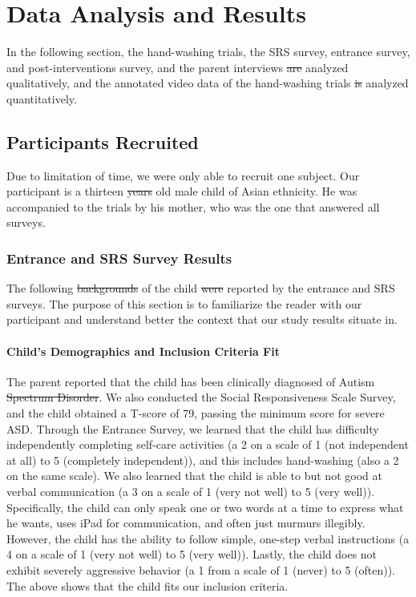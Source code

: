 \documentclass{ut-thesis}
\providecommand{\DIFaddtex}[1]{{\protect\color{blue}\uwave{#1}}} %
\providecommand{\DIFdeltex}[1]{{\protect\color{red}\sout{#1}}}                      %
\providecommand{\DIFaddbegin}{} %
\providecommand{\DIFaddend}{} %
\providecommand{\DIFdelbegin}{} %
\providecommand{\DIFdelend}{} %
\providecommand{\DIFadd}[1]{\texorpdfstring{\DIFaddtex{#1}}{#1}} %
\providecommand{\DIFdel}[1]{\texorpdfstring{\DIFdeltex{#1}}{}} %
\begin{document}
\section{Data Analysis and Results}
\DIFaddbegin \label{Sec:DataAnalysisAndResults}
\DIFaddend In the following section, the hand-washing trials, the SRS survey, entrance survey, and post-interventions survey, and the parent interviews \DIFdelbegin \DIFdel{are }\DIFdelend \DIFaddbegin \DIFadd{were }\DIFaddend analyzed qualitatively, and the annotated video data of the hand-washing trials \DIFdelbegin \DIFdel{is }\DIFdelend \DIFaddbegin \DIFadd{was }\DIFaddend analyzed quantitatively.

\subsection{Participants Recruited}
Due to limitation of time, we were only able to recruit one subject.  Our participant is a thirteen \DIFdelbegin \DIFdel{years }\DIFdelend \DIFaddbegin \DIFadd{year }\DIFaddend old male child of Asian ethnicity.  He was accompanied to the trials by his mother, who was the one that answered all surveys.

\subsubsection{Entrance and SRS Survey Results}
The following \DIFdelbegin \DIFdel{backgrounds }\DIFdelend \DIFaddbegin \DIFadd{background }\DIFaddend of the child \DIFdelbegin \DIFdel{were }\DIFdelend \DIFaddbegin \DIFadd{was }\DIFaddend reported by the entrance and SRS surveys.  The purpose of this section is to familiarize the reader with our participant and understand better the context that our study results situate in.

\paragraph{Child's Demographics and Inclusion Criteria Fit}
The parent reported that the child has been clinically diagnosed of Autism \DIFdelbegin \DIFdel{Spectrum Disorder}\DIFdelend \DIFaddbegin \DIFadd{spectrum disorder}\DIFaddend .  We also conducted the Social Responsiveness Scale Survey, and the child obtained a T-score of 79, passing the minimum score for severe ASD.  Through the Entrance Survey, we learned that the child has difficulty independently completing self-care activities (a 2 on a scale of 1 (not independent at all) to 5 (completely independent)), and this includes hand-washing (also a 2 on the same scale).  We also learned that the child is able to but not good at verbal communication (a 3 on a scale of 1 (very not well) to 5 (very well)).  Specifically, the child can only speak one or two words at a time to express what he wants, uses iPad for communication, and often just murmurs illegibly.  However, the child has the ability to follow simple, one-step verbal instructions (a 4 on a scale of 1 (very not well) to 5 (very well)).  Lastly, the child does not exhibit severely aggressive behavior (a 1 from a scale of 1 (never) to 5 (often)).  The above shows that the child fits our inclusion criteria.
\end{document}
